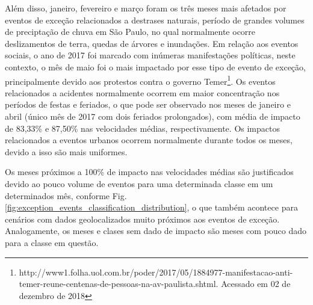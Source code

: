 \documentclass[
	12pt,				%
	oneside,			%
	a4paper,			%
	english,			%
	brazil				%
	]{abntex2ppgsi}
\begin{document}
Além disso, janeiro, fevereiro e março foram os três meses mais afetados por eventos de exceção relacionados a destrases naturais, período de grandes volumes de preciptação de chuva em São Paulo, no qual normalmente ocorre deslizamentos de terra, quedas de árvores e inundações.  Em relação aos eventos sociais, o ano de 2017 foi marcado com inúmeras manifestações políticas, neste contexto, o mês de maio foi o mais impactado por esse tipo de evento de exceção, principalmente devido aos protestos contra o governo Temer\footnote{{http://www1.folha.uol.com.br/poder/2017/05/1884977-manifestacao-anti-\newline temer-reune-centenas-de-pessoas-na-av-paulista.shtml}. Acessado em 02 de dezembro de 2018}. Os eventos relacionados a acidentes normalmente ocorrem em maior concentração nos períodos de festas e feriados, o que pode ser observado nos meses de janeiro e abril (único mês de 2017 com dois feriados prolongados), com média de impacto de 83,33\% e 87,50\% nas velocidades médias, respectivamente.  Os impactos relacionados a eventos urbanos ocorrem normalmente durante todos os meses, devido a isso são mais uniformes.

Os meses próximos a 100\% de impacto nas velocidades médias são justificados devido ao pouco volume de eventos para uma determinada classe em um determinados mês, conforme Fig. \ref{fig:exception_events_classification_distribution}, o que também acontece para cenários com dados geolocalizados muito próximos aos eventos de exceção. Analogamente, os meses e clases sem dado de impacto são meses com pouco dado para a classe em questão. 
\end{document}
